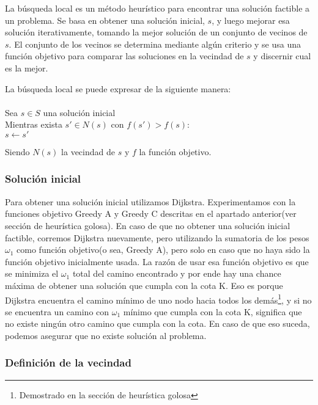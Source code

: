 
La búsqueda local es un método heurístico para encontrar una solución factible a un problema. Se basa en obtener una solución inicial, $s$, y luego mejorar esa solución iterativamente, tomando la mejor solución de un conjunto de vecinos de $s$. El conjunto de los vecinos se determina mediante algún criterio y se usa una función objetivo para comparar las soluciones en la vecindad de $s$ y discernir cual es la mejor.

La búsqueda local se puede expresar de la siguiente manera:\\\\
\hspace*{1 cm} Sea $s \in S$ una solución inicial\\
\hspace*{1 cm} Mientras exista $s' \in N(s)$ con $f(s') > f(s)$:\\
\hspace*{2 cm} $s \leftarrow s'$

Siendo $N(s)$ la vecindad de $s$ y $f$ la función objetivo.

\subsubsection{Solución inicial}

Para obtener una solución inicial utilizamos Dijkstra. Experimentamos con la funciones objetivo Greedy A y Greedy C descritas en el apartado anterior(ver sección de heurística golosa). En caso de que no obtener una solución inicial factible, corremos Dijkstra nuevamente, pero utilizando la sumatoria de los pesos $\omega_1$ como función objetivo(o sea, Greedy A), pero solo en caso que no haya sido la función objetivo inicialmente usada. La razón de usar esa función objetivo es que se minimiza el $\omega_1$ total del camino encontrado y por ende hay una chance máxima de obtener una solución que cumpla con la cota K. Eso es porque Dijkstra encuentra el camino mínimo de uno nodo hacia todos los demás\footnote{Demostrado en la sección de heurística golosa}, y si no se encuentra un camino con $\omega_1$ mínimo que cumpla con la cota K, significa que no existe ningún otro camino que cumpla con la cota. En caso de que eso suceda, podemos asegurar que no existe solución al problema.

\subsubsection{Definición de la vecindad}

